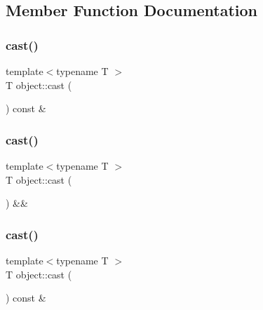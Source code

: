 \subsection{Member Function Documentation}
\mbox{\label{classobject_acf93eb705d6539ef22e2c4a8eebc4c68}} 
\subsubsection{\texorpdfstring{cast()}{cast()}\hspace{0.1cm}{\footnotesize\ttfamily [1/6]}}
{\footnotesize\ttfamily template$<$typename T $>$ \\
T object\+::cast (\begin{DoxyParamCaption}{ }\end{DoxyParamCaption}) const \&}

\mbox{\label{classobject_a213e60c515e4e3273967df63e06db4e3}} 
\subsubsection{\texorpdfstring{cast()}{cast()}\hspace{0.1cm}{\footnotesize\ttfamily [2/6]}}
{\footnotesize\ttfamily template$<$typename T $>$ \\
T object\+::cast (\begin{DoxyParamCaption}{ }\end{DoxyParamCaption}) \&\&}

\mbox{\label{classobject_acf93eb705d6539ef22e2c4a8eebc4c68}} 
\subsubsection{\texorpdfstring{cast()}{cast()}\hspace{0.1cm}{\footnotesize\ttfamily [3/6]}}
{\footnotesize\ttfamily template$<$typename T $>$ \\
T object\+::cast (\begin{DoxyParamCaption}{ }\end{DoxyParamCaption}) const \&}

\mbox{\label{classobject_a213e60c515e4e3273967df63e06db4e3}} 
